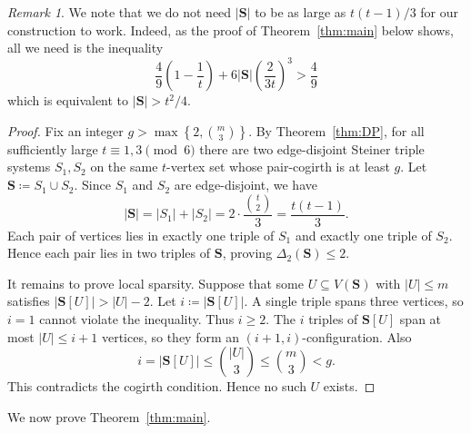 \documentclass[10pt]{article}
\numberwithin{equation}{section}
\theoremstyle{definition}
\theoremstyle{remark}
\newtheorem{remark}[theorem]{Remark}
\newcommand{\Sint}{\mathbf{S}}
\begin{document}
\begin{remark}
   We note that we do not need $|\Sint|$ to be as large as $t(t-1)/3$ for our construction to work. Indeed, as the proof of Theorem~\ref{thm:main} below shows, all we need is the inequality
   $$ \frac49\left(1-\frac1t\right)+6|\Sint|\left(\frac{2}{3t}\right)^3>\frac49$$
   which is equivalent to $|\Sint|>t^2/4$.
\end{remark}

\begin{proof}
Fix an integer $g>\max\left\{2,\binom m3\right\}$. By Theorem~\ref{thm:DP}, for all sufficiently large $t\equiv1,3\pmod6$ there are two edge-disjoint Steiner triple systems $S_1,S_2$ on the same $t$-vertex set whose pair-cogirth is at least $g$. Let $\Sint \coloneqq S_1\cup S_2$. Since $S_1$ and $S_2$ are edge-disjoint, we have
\[
        |\Sint|=|S_1|+|S_2|=2\cdot\frac{\binom t2}{3}=\frac{t(t-1)}3.
\]
Each pair of vertices lies in exactly one triple of $S_1$ and exactly one triple of $S_2$. Hence each pair lies in two triples of $\Sint$, proving $\Delta_2(\Sint)\le2$.


It remains to prove local sparsity. Suppose that some $U\subseteq V(\Sint)$ with $|U|\le m$ satisfies $|\Sint[U]|>|U|-2$. Let $i \coloneqq |\Sint[U]|$. A single triple spans three vertices, so $i=1$ cannot violate the inequality. Thus $i\ge2$. The $i$ triples of $\Sint[U]$ span at most $|U|\le i+1$ vertices, so they form an $(i+1,i)$-configuration. Also
\[
        i=|\Sint[U]|\le \binom{|U|}{3}\le\binom m3<g.
\]
This contradicts the cogirth condition. Hence no such $U$ exists.
\end{proof}


We now prove Theorem~\ref{thm:main}.
\end{document}
